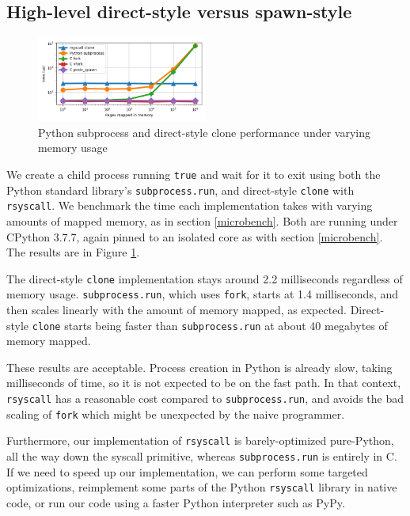 \documentclass[letterpaper,twocolumn,10pt]{article}
\begin{document}
\subsection{High-level direct-style versus spawn-style}\label{subprocess_bench}
\begin{figure}[h!]
\centering
 \includegraphics[width=0.5\textwidth]{subprocess_bench}
 \caption{Python subprocess and direct-style clone performance under varying memory usage}
 \label{fig:subprocess_bench}
\end{figure}

We create a child process running \texttt{true} and wait for it to exit
using both the Python standard library's \texttt{subprocess.run},
and direct-style \texttt{clone} with \texttt{rsyscall}.
We benchmark the time each implementation takes
with varying amounts of mapped memory, as in section \ref{microbench}.
Both are running under CPython 3.7.7,
again pinned to an isolated core as with section \ref{microbench}.
The results are in Figure \ref{fig:subprocess_bench}.

The direct-style \texttt{clone} implementation stays around 2.2 milliseconds regardless of memory usage.
\texttt{subprocess.run}, which uses \texttt{fork},
starts at 1.4 milliseconds,
and then scales linearly with the amount of memory mapped, as expected.
Direct-style \texttt{clone} starts being faster than \texttt{subprocess.run}
at about 40 megabytes of memory mapped.

These results are acceptable.
Process creation in Python is already slow, taking milliseconds of time,
so it is not expected to be on the fast path.
In that context, \texttt{rsyscall} has a reasonable cost compared to \texttt{subprocess.run},
and avoids the bad scaling of \texttt{fork} which might be unexpected by the naive programmer.

Furthermore,
our implementation of \texttt{rsyscall} is barely-optimized pure-Python,
all the way down the syscall primitive,
whereas \texttt{subprocess.run} is entirely in C.
If we need to speed up our implementation,
we can perform some targeted optimizations,
reimplement some parts of the Python \texttt{rsyscall} library in native code,
or run our code using a faster Python interpreter such as PyPy.
\end{document}
